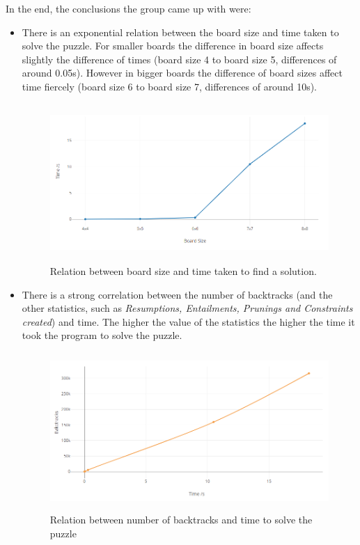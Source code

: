 \documentclass{llncs}
\begin{document}
In the end, the conclusions the group came up with were:
\begin{itemize}
	\item There is an exponential relation between the board size and time taken to solve the puzzle. For smaller boards the difference in board size affects slightly the difference of times (board size 4 to board size 5, differences of around 0.05s). However in bigger boards the difference of board sizes affect time fiercely (board size 6 to board size 7, differences of around 10s).\\

\begin{figure}[h!]
\begin{center}
\includegraphics[height=6cm,width=12cm]{images/graph1.png}
\caption{Relation between board size and time taken to find a solution.}
\label{Figure 5}
\end{center}
\end{figure}

	\item There is a strong correlation between the number of backtracks (and the other statistics, such as \textit{Resumptions, Entailments, Prunings and Constraints created}) and time. The higher the value of the statistics the higher the time it took the program to solve the puzzle.\\

\begin{figure}[h!]
\begin{center}
\includegraphics[height=6cm,width=12cm]{images/graph2.png}
\caption{Relation between number of backtracks and time to solve the puzzle}
\label{Figure 6}
\end{center}
\end{figure}
	

\end{itemize}
\end{document}
